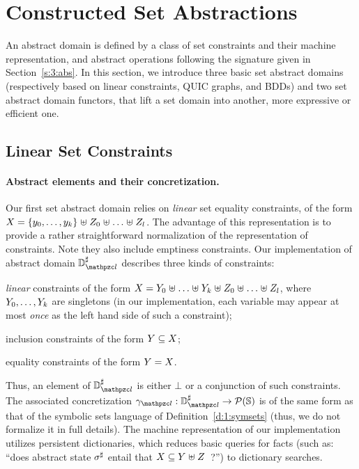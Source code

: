 \section{Constructed Set Abstractions}
\label{sec:constructed} \label{s:4:domains}
An abstract domain is defined by a class of set constraints and their machine
representation, and abstract operations following the signature given in
Section~\ref{s:3:abs}.
In this section, we introduce three basic set abstract domains (respectively
based on linear constraints, QUIC graphs, and BDDs) and two set abstract
domain functors, that lift a set domain into another, more expressive or
efficient one.

\subsection{Linear Set Constraints}
\label{s:4:1:lin}
\newcommand{\adomlin}{\adom_{\zcl}}
\newcommand{\gammalin}{\gamma_{\zcl}}
\paragraph{Abstract elements and their concretization.}
Our first set abstract domain relies on {\em linear} set equality
constraints, of the form \( X = \{ y_0, \ldots, y_k \} \mathrel{\uplus}
Z_0 \mathrel{\uplus} \ldots \mathrel{\uplus} Z_l \).
The advantage of this representation is to provide a rather straightforward
normalization of the representation of constraints.
Note they also include emptiness constraints.
Our implementation of abstract domain \( \adomlin \) describes three kinds
of constraints:
\begin{compactitem}
\item {\em linear} constraints of the form \( X = Y_0 \mathrel{\uplus}
  \ldots \mathrel{\uplus} Y_k \mathrel{\uplus} Z_0 \mathrel{\uplus} \ldots \mathrel{\uplus}
  Z_l \), where \( Y_0, \ldots, Y_k \) are singletons
  (in our implementation, each variable may appear at most {\em once}
  as the left hand side of such a constraint);
\item inclusion constraints of the form \( Y \subseteq X \);
\item equality constraints of the form \( Y = X \).
\end{compactitem}
Thus, an element of \( \adomlin \) is either \( \bot \) or a conjunction of
such constraints.
The associated concretization \( \gammalin: \adomlin \rightarrow
\partsof{\states} \) is of the same form as that of the symbolic sets
language of Definition~\ref{d:1:symsets} (thus, we do not formalize it
in full details).
The machine representation of our implementation utilizes persistent
dictionaries, which reduces basic queries for facts (such as: ``does
abstract state \( {\sigma}^{\sharp} \) entail that \( X \subseteq Y
\mathrel{\uplus} Z \)~?'') to dictionary searches.


